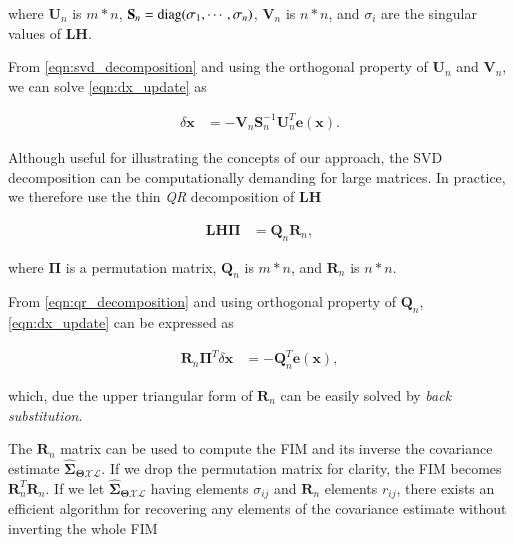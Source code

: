 where $\mathbf{U}_n$ is $m*n$, $\mathbf{S}_n=\operatorname{diag}(\sigma_1, \cdots, \sigma_n)$,
$\mathbf{V}_n$ is $n*n$, and $\sigma_i$ are the singular values of
$\mathbf{L}\mathbf{H}$.

From \eqref{eqn:svd_decomposition} and using the orthogonal property of
$\mathbf{U}_n$ and $\mathbf{V}_n$, we can solve \eqref{eqn:dx_update} as

\begin{equation}\label{eqn:dx_svd_solve}
  \begin{aligned}
  \delta\mathbf{x} &= -\mathbf{V}_n\mathbf{S}_n^{-1}\mathbf{U}_n^T
    \mathbf{e}(\mathbf{x}).
  \end{aligned}
\end{equation}

Although useful for illustrating the concepts of our approach, the SVD
decomposition can be computationally demanding for large matrices. In practice,
we therefore use the thin \emph{QR} decomposition of $\mathbf{L}\mathbf{H}$

\begin{equation}\label{eqn:qr_decomposition}
  \begin{aligned}
  \mathbf{L}\mathbf{H}\boldsymbol{\Pi} &= \mathbf{Q}_n\mathbf{R}_n,
  \end{aligned}
\end{equation}

where $\boldsymbol{\Pi}$ is a permutation matrix, $\mathbf{Q}_n$ is $m*n$, and
$\mathbf{R}_n$ is $n*n$.

From \eqref{eqn:qr_decomposition} and using orthogonal property of
$\mathbf{Q}_n$, \eqref{eqn:dx_update} can be expressed as

\begin{equation}\label{eqn:dx_qr_solve}
  \begin{aligned}
  \mathbf{R}_n\boldsymbol{\Pi}^{T}\delta\mathbf{x} &=
    -\mathbf{Q}_n^T \mathbf{e}(\mathbf{x}),
  \end{aligned}
\end{equation}

which, due the upper triangular form of $\mathbf{R}_n$ can be easily solved by
\emph{back substitution}.

The $\mathbf{R}_n$ matrix can be used to compute the FIM and its
inverse the covariance estimate
$\hat{\boldsymbol{\Sigma}}_{\boldsymbol{\Theta}\mathcal{X}\mathcal{L}}$. If we
drop the permutation matrix for clarity, the FIM becomes
$\mathbf{R}_n^T\mathbf{R}_n$. If we let
$\hat{\boldsymbol{\Sigma}}_{\boldsymbol{\Theta}\mathcal{X}\mathcal{L}}$ having
elements $\sigma_{ij}$ and $\mathbf{R}_n$ elements $r_{ij}$, there exists an
efficient algorithm for recovering any elements of the covariance estimate
without inverting the whole FIM

